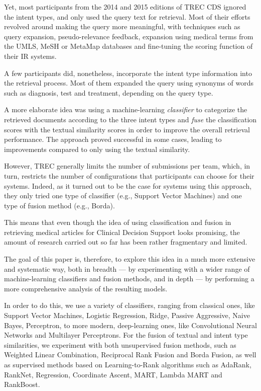 Yet, most participants from the 2014 and 2015 editions of TREC CDS ignored the intent types,
and only used the query text for retrieval.
Most of their efforts revolved around making the query more meaningful, with techniques
such as query expansion, pseudo-relevance feedback, expansion using medical terms from the UMLS, MeSH or MetaMap databases and
fine-tuning the scoring function of their IR systems.

A few participants did, nonetheless, incorporate the intent type information into the retrieval process. Most of them
 expanded the query using synonyms of words such as diagnosis, test and treatment, depending on the query type.

A more elaborate idea was using a machine-learning \emph{classifier} to categorize the retrieved documents according
to the three intent types and \emph{fuse} the classification scores
with the textual similarity scores in order to improve the overall retrieval performance.
The approach proved successful in some cases, leading to improvements compared to only using the textual similarity.

However, TREC generally limits the number of submissions per team, which, in turn, restricts
the number of configurations that participants can choose for their systems.
Indeed, as it turned out to be the case for systems using this approach,
they only tried one type of classifier (e.g., Support Vector Machines)
and one type of fusion method (e.g., Borda).

This means that even though the idea of using classification and fusion
in retrieving medical articles for Clinical Decision Support looks promising,
the amount of research carried out so far has been rather fragmentary and limited.

The goal of this paper is, therefore, to
explore this idea in a much more extensive and systematic way, both in breadth --- by experimenting
with a wider range of machine-learning classifiers and fusion methods,
and in depth --- by performing a more comprehensive analysis of the resulting models.

In order to do this, we use a variety of classifiers, ranging from classical ones, like Support Vector Machines,
Logistic Regression, Ridge, Passive Aggressive, Naive Bayes, Perceptron,
to more modern, deep-learning ones, like Convolutional Neural Networks and Multilayer Perceptrons.
For the fusion of textual and intent type similarities,
we experiment with both unsupervised fusion methods, such as Weighted Linear Combination, Reciprocal Rank Fusion and Borda Fusion,
as well as supervised methods based
on Learning-to-Rank algorithms such as AdaRank, RankNet, Regression, Coordinate Ascent, MART, Lambda MART and RankBoost.

